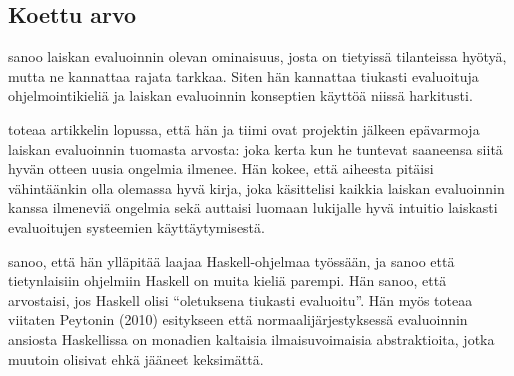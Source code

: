 \subsection{Koettu arvo}

\citet{vesakarvonen} sanoo laiskan evaluoinnin olevan ominaisuus, josta on tietyissä tilanteissa hyötyä, mutta ne kannattaa rajata tarkkaa. Siten hän kannattaa tiukasti evaluoituja ohjelmointikieliä ja laiskan evaluoinnin konseptien käyttöä niissä harkitusti.

\citet{sampson2009experience} toteaa artikkelin lopussa, että hän ja tiimi ovat projektin jälkeen epävarmoja laiskan evaluoinnin tuomasta arvosta: joka kerta kun he tuntevat saaneensa siitä hyvän otteen uusia ongelmia ilmenee. Hän kokee, että aiheesta pitäisi vähintäänkin olla olemassa hyvä kirja, joka käsittelisi kaikkia laiskan evaluoinnin kanssa ilmeneviä ongelmia sekä auttaisi luomaan lukijalle hyvä intuitio laiskasti evaluoitujen systeemien käyttäytymisestä.

\citet{mohanhackernews} sanoo, että hän ylläpitää laajaa Haskell-ohjelmaa työssään, ja sanoo että tietynlaisiin ohjelmiin Haskell on muita kieliä parempi.  Hän sanoo, että arvostaisi, jos Haskell olisi ``oletuksena tiukasti evaluoitu''. Hän myös toteaa viitaten Peytonin (2010) esitykseen että normaalijärjestyksessä evaluoinnin ansiosta Haskellissa on monadien kaltaisia ilmaisuvoimaisia abstraktioita, jotka muutoin olisivat ehkä jääneet keksimättä.